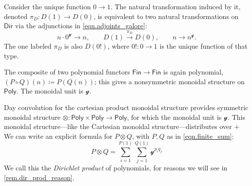 \documentclass[11pt, article, one side]{memoir}
\theoremstyle{theorem}
\theoremstyle{definition}
\theoremstyle{remark}
\newcommand{\Cat}[1]{\mathsf{#1}}%
\newcommand{\To}[1]{\xrightarrow{#1}}
\newcommand{\fin}{\Cat{Fin}}
\newcommand{\yon}{\mathcal{y}}
\newcommand{\poly}{\Cat{Poly}}
\newcommand{\dir}{\Cat{Dir}}
\newcommand{\mdot}{{\cdot}}
\begin{document}
Consider the unique function $0\to 1$. The natural transformation induced by it, denoted $\pi_D\colon D(1)\to D(0)$, is equivalent to two natural transformations on $\dir$ via the adjunctions in \cref{eqn.adjoints_galore}:
\begin{equation}\label{eqn.obtain_pi}
n\mdot0^\yon\to n,\qquad
D(1)\To{\pi_D} D(0),\qquad
n\to n^\yon.
\end{equation}
The one labeled $\pi_D$ is also $D(0!)$, where $0!\colon 0\to 1$ is the unique function of that type.

The composite of two polynomial functors $\fin\to\fin$ is again polynomial, $(P\circ Q)(n)\coloneqq P(Q(n))$; this gives a nonsymmetric monoidal structure on $\poly$. The monoidal unit is $\yon$.

Day convolution for the cartesian product monoidal structure provides symmetric monoidal structure $\otimes\colon\poly\times\poly\to\poly$, for which the monoidal unit is $\yon$. This monoidal structure---like the Cartesian monoidal structure---distributes over $+$ We can write an explicit formula for $P\otimes Q$, with $P,Q$ as in \cref{eqn.finite_sum}:
\begin{equation}\label{eqn.dir_monoidal_product}
  P\otimes
  Q=
  \sum_{i=1}^{P(1)}\sum_{j=1}^{Q(1)}\yon^{p_iq_j}
\end{equation}
We call this the \emph{Dirichlet product} of polynomials, for reasons we will see in \cref{rem.dir_prod_reason}.
\end{document}

